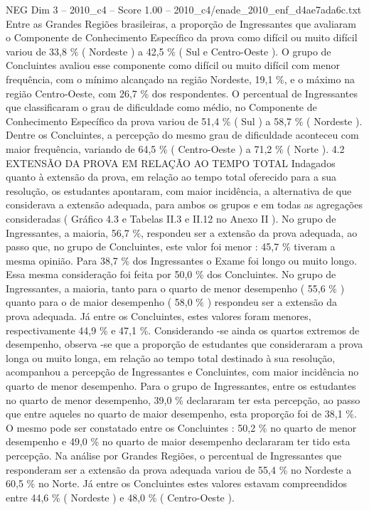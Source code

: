 \begin{textsample}{NEG Dim 3 – 2010\_c4 – Score 1.00 – 2010\_c4/enade\_2010\_enf\_d4ae7ada6c.txt}
Entre as Grandes Regiões brasileiras, a proporção de Ingressantes que avaliaram o Componente de Conhecimento Específico da prova como difícil ou muito difícil variou de 33,8 \% ( Nordeste ) a 42,5 \% ( Sul e Centro-Oeste ).
O grupo de Concluintes avaliou esse componente como difícil ou muito difícil com menor frequência, com o mínimo alcançado na região Nordeste, 19,1 \%, e o máximo na região Centro-Oeste, com 26,7 \% dos respondentes.
O percentual de Ingressantes que classificaram o grau de dificuldade como médio, no Componente de Conhecimento Específico da prova variou de 51,4 \% ( Sul ) a 58,7 \% ( Nordeste ).
Dentre os Concluintes, a percepção do mesmo grau de dificuldade aconteceu com maior frequência, variando de 64,5 \% ( Centro-Oeste ) a 71,2 \% ( Norte ). 4.2 EXTENSÃO DA PROVA EM RELAÇÃO AO TEMPO TOTAL Indagados quanto à extensão da prova, em relação ao tempo total oferecido para a sua resolução, os estudantes apontaram, com maior incidência, a alternativa de que considerava a extensão adequada, para ambos os grupos e em todas as agregações consideradas ( Gráfico 4.3 e Tabelas II.3 e II.12 no Anexo II ).
No grupo de Ingressantes, a maioria, 56,7 \%, respondeu ser a extensão da prova adequada, ao passo que, no grupo de Concluintes, este valor foi menor : 45,7 \% tiveram a mesma opinião.
Para 38,7 \% dos Ingressantes o Exame foi longo ou muito longo.
Essa mesma consideração foi feita por 50,0 \% dos Concluintes.
No grupo de Ingressantes, a maioria, tanto para o quarto de menor desempenho ( 55,6 \% ) quanto para o de maior desempenho ( 58,0 \% ) respondeu ser a extensão da prova adequada.
Já entre os Concluintes, estes valores foram menores, respectivamente 44,9 \% e 47,1 \%.
Considerando -se ainda os quartos extremos de desempenho, observa -se que a proporção de estudantes que consideraram a prova longa ou muito longa, em relação ao tempo total destinado à sua resolução, acompanhou a percepção de Ingressantes e Concluintes, com maior incidência no quarto de menor desempenho.
Para o grupo de Ingressantes, entre os estudantes no quarto de menor desempenho, 39,0 \% declararam ter esta percepção, ao passo que entre aqueles no quarto de maior desempenho, esta proporção foi de 38,1 \%.
O mesmo pode ser constatado entre os Concluintes : 50,2 \% no quarto de menor desempenho e 49,0 \% no quarto de maior desempenho declararam ter tido esta percepção.
Na análise por Grandes Regiões, o percentual de Ingressantes que responderam ser a extensão da prova adequada variou de 55,4 \% no Nordeste a 60,5 \% no Norte.
Já entre os Concluintes estes valores estavam compreendidos entre 44,6 \% ( Nordeste ) e 48,0 \% ( Centro-Oeste ).

\end{textsample}
